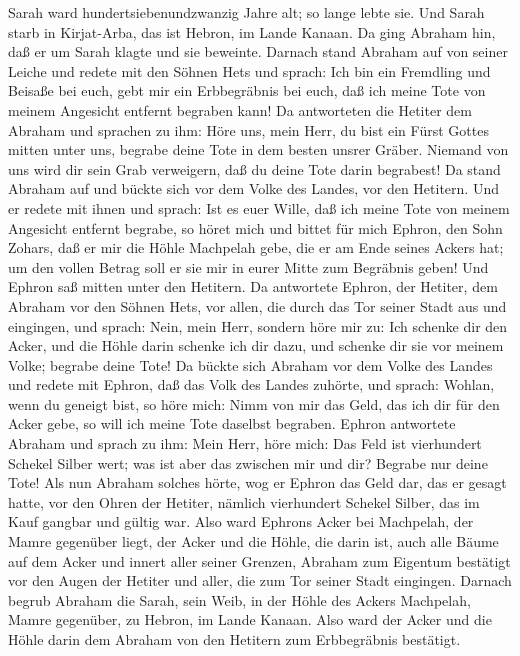  Sarah ward hundertsiebenundzwanzig Jahre alt; so lange
lebte sie.  Und Sarah starb in Kirjat-Arba, das ist
Hebron, im Lande Kanaan. Da ging Abraham hin, daß er um Sarah klagte und
sie beweinte.  Darnach stand Abraham auf von seiner Leiche
und redete mit den Söhnen Hets und sprach:  Ich bin ein
Fremdling und Beisaße bei euch, gebt mir ein Erbbegräbnis bei euch, daß
ich meine Tote von meinem Angesicht entfernt begraben kann!
 Da antworteten die Hetiter dem Abraham und sprachen zu
ihm:  Höre uns, mein Herr, du bist ein Fürst Gottes mitten
unter uns, begrabe deine Tote in dem besten unsrer Gräber. Niemand von
uns wird dir sein Grab verweigern, daß du deine Tote darin begrabest!
 Da stand Abraham auf und bückte sich vor dem Volke des
Landes, vor den Hetitern.  Und er redete mit ihnen und
sprach: Ist es euer Wille, daß ich meine Tote von meinem Angesicht
entfernt begrabe, so höret mich und bittet für mich Ephron, den Sohn
Zohars,  daß er mir die Höhle Machpelah gebe, die er am
Ende seines Ackers hat; um den vollen Betrag soll er sie mir in eurer
Mitte zum Begräbnis geben!  Und Ephron saß mitten unter
den Hetitern. Da antwortete Ephron, der Hetiter, dem Abraham vor den
Söhnen Hets, vor allen, die durch das Tor seiner Stadt aus und
eingingen, und sprach:  Nein, mein Herr, sondern höre mir
zu: Ich schenke dir den Acker, und die Höhle darin schenke ich dir dazu,
und schenke dir sie vor meinem Volke; begrabe deine Tote!
 Da bückte sich Abraham vor dem Volke des Landes
 und redete mit Ephron, daß das Volk des Landes zuhörte,
und sprach: Wohlan, wenn du geneigt bist, so höre mich: Nimm von mir das
Geld, das ich dir für den Acker gebe, so will ich meine Tote daselbst
begraben.  Ephron antwortete Abraham und sprach zu ihm:
 Mein Herr, höre mich: Das Feld ist vierhundert Schekel
Silber wert; was ist aber das zwischen mir und dir? Begrabe nur deine
Tote!  Als nun Abraham solches hörte, wog er Ephron das
Geld dar, das er gesagt hatte, vor den Ohren der Hetiter, nämlich
vierhundert Schekel Silber, das im Kauf gangbar und gültig war.
 Also ward Ephrons Acker bei Machpelah, der Mamre
gegenüber liegt, der Acker und die Höhle, die darin ist, auch alle Bäume
auf dem Acker und innert aller seiner Grenzen,  Abraham
zum Eigentum bestätigt vor den Augen der Hetiter und aller, die zum Tor
seiner Stadt eingingen.  Darnach begrub Abraham die
Sarah, sein Weib, in der Höhle des Ackers Machpelah, Mamre gegenüber, zu
Hebron, im Lande Kanaan.  Also ward der Acker und die
Höhle darin dem Abraham von den Hetitern zum Erbbegräbnis bestätigt.

